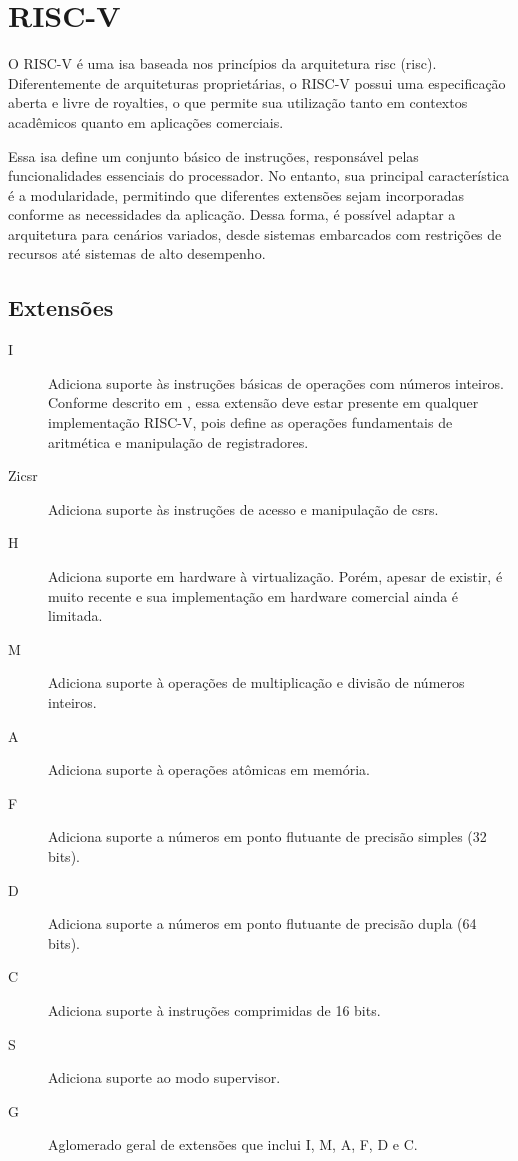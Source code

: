 \section{RISC-V}

O RISC-V é uma \gls{isa} baseada nos princípios da arquitetura \acrshort{risc} (\acrlong{risc}). Diferentemente de arquiteturas proprietárias,
o RISC-V possui uma especificação aberta e livre de royalties, o que permite sua utilização tanto em contextos acadêmicos quanto em aplicações
comerciais.

Essa \gls{isa} define um conjunto básico de instruções, responsável pelas funcionalidades essenciais do processador. No entanto, sua
principal característica é a modularidade, permitindo que diferentes extensões sejam incorporadas conforme as necessidades da aplicação.
Dessa forma, é possível adaptar a arquitetura para cenários variados, desde sistemas embarcados com restrições de recursos até sistemas de
alto desempenho.

\subsection{Extensões}

\begin{description}

\item[I]
Adiciona suporte às instruções básicas de operações com números inteiros. Conforme descrito em \cite{RISCVUnprivilegedISA}, essa extensão deve estar
presente em qualquer implementação RISC-V, pois define as operações fundamentais de aritmética e manipulação de registradores.

\item[Zicsr]
Adiciona suporte às instruções de acesso e manipulação de \glspl{csr}.

\item[H]
Adiciona suporte em hardware à virtualização. Porém, apesar de existir, é muito recente e sua implementação em hardware comercial ainda é limitada.

\item[M]
Adiciona suporte à operações de multiplicação e divisão de números inteiros.

\item[A]
Adiciona suporte à operações atômicas em memória.

\item[F]
Adiciona suporte a números em ponto flutuante de precisão simples (32 bits).

\item[D]
Adiciona suporte a números em ponto flutuante de precisão dupla (64 bits).

\item[C]
Adiciona suporte à instruções comprimidas de 16 bits.

\item[S]
Adiciona suporte ao modo supervisor.

\item[G]
Aglomerado geral de extensões que inclui I, M, A, F, D e C.

\end{description}

